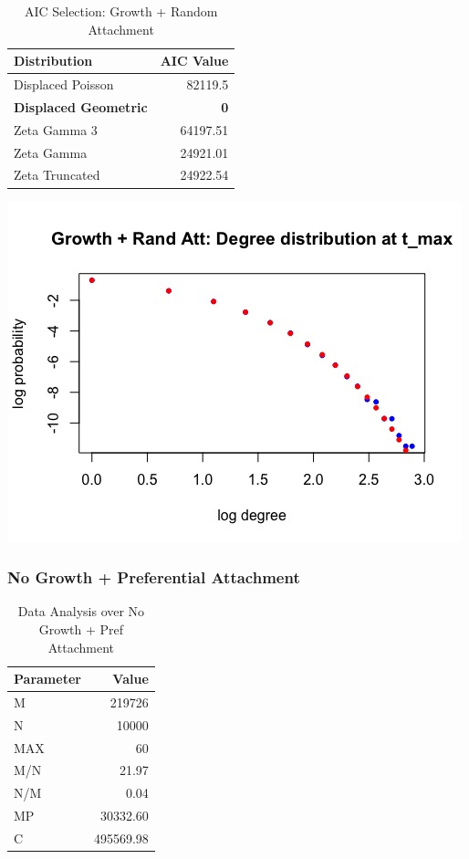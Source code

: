 \documentclass[12pt, a4paper]{article}
\begin{document}
\begin{table}[H]
    \centering
    \begin{tabular}{l r}
        Distribution & AIC Value\\
        \hline
        Displaced Poisson & 82119.5\\
        \textbf{Displaced Geometric} & \textbf{0}\\
        Zeta Gamma 3 & 64197.51\\
        Zeta Gamma & 24921.01\\ 
        Zeta Truncated & 24922.54\\
    \end{tabular}
    \caption{AIC Selection: Growth + Random Attachment}
    \label{table:grow_ran_att_3}
\end{table}

\begin{minipage}[t]{\linewidth}
    \includegraphics[width=\textwidth]{degree_tmax_grow_random_att}
    \captionsetup{type=figure}
    \label{fig:degree_tmax_grow_random_att}
  \end{minipage}

\subsubsection{No Growth + Preferential Attachment}

  \begin{table}[H]
      \centering
      \begin{tabular}{l r}
          Parameter & Value\\
          \hline              
          M & 219726\\
          N & 10000\\
          MAX & 60\\
          M/N & 21.97\\
          N/M & 0.04\\
          MP & 30332.60\\
          C & 495569.98
      \end{tabular}
      \caption{Data Analysis over No Growth + Pref Attachment}
      \label{table:no_grow_pref_att_1}
  \end{table}
  
\end{document}
